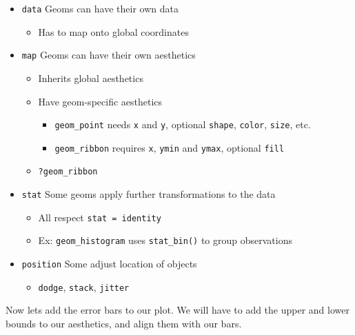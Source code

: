 \documentclass[]{book}
\providecommand{\tightlist}{%
  \setlength{\itemsep}{0pt}\setlength{\parskip}{0pt}}
\theoremstyle{definition}
\theoremstyle{definition}
\theoremstyle{definition}
\theoremstyle{remark}
\begin{document}
\begin{itemize}
\tightlist
\item
  \texttt{data} Geoms can have their own data

  \begin{itemize}
  \tightlist
  \item
    Has to map onto global coordinates
  \end{itemize}
\item
  \texttt{map} Geoms can have their own aesthetics

  \begin{itemize}
  \tightlist
  \item
    Inherits global aesthetics
  \item
    Have geom-specific aesthetics

    \begin{itemize}
    \tightlist
    \item
      \texttt{geom\_point} needs \texttt{x} and \texttt{y}, optional
      \texttt{shape}, \texttt{color}, \texttt{size}, etc.
    \item
      \texttt{geom\_ribbon} requires \texttt{x}, \texttt{ymin} and
      \texttt{ymax}, optional \texttt{fill}
    \end{itemize}
  \item
    \texttt{?geom\_ribbon}
  \end{itemize}
\item
  \texttt{stat} Some geoms apply further transformations to the data

  \begin{itemize}
  \tightlist
  \item
    All respect
    \texttt{stat\ =\ \textquotesingle{}identity\textquotesingle{}}
  \item
    Ex: \texttt{geom\_histogram} uses \texttt{stat\_bin()} to group
    observations
  \end{itemize}
\item
  \texttt{position} Some adjust location of objects

  \begin{itemize}
  \tightlist
  \item
    \texttt{\textquotesingle{}dodge\textquotesingle{}},
    \texttt{\textquotesingle{}stack\textquotesingle{}},
    \texttt{\textquotesingle{}jitter\textquotesingle{}}
  \end{itemize}
\end{itemize}

Now lets add the error bars to our plot. We will have to add the upper
and lower bounds to our aesthetics, and align them with our bars.
\end{document}
